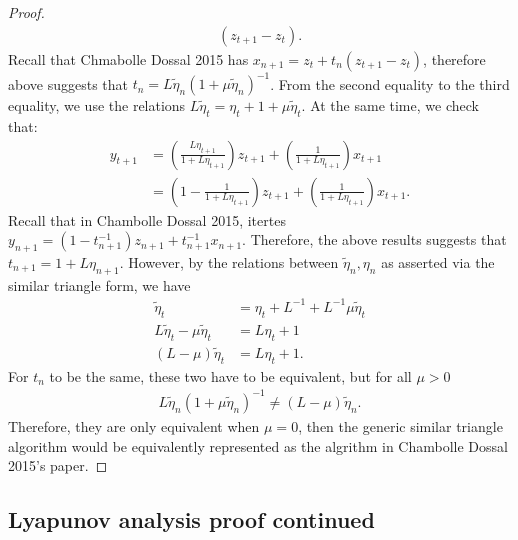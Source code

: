 \documentclass[12pt]{article}
\begin{document}
\begin{proof}
\begin{align*}
                (z_{t + 1} - z_t). 
            \end{align*}
            Recall that Chmabolle Dossal 2015 has $x_{n + 1} = z_t + t_n(z_{t + 1} - z_t)$, 
            therefore above suggests that $t_n = L \tilde \eta_{n}(1 + \mu \tilde \eta_{n})^{-1}$. 
            From the second equality to the third equality, we use the relations $L\tilde \eta_{t} = \eta_t + 1 + \mu\tilde \eta_{t}$.
            At the same time, we check that: 
            \begin{align*}
                y_{t + 1} &= \left(
                    \frac{L\eta_{t + 1}}{1 + L \eta_{t + 1}}
                \right)z_{t + 1} + 
                \left(
                    \frac{1}{1 + L \eta_{t + 1}}
                \right) x_{t + 1}
                \\
                &= 
                \left(
                    1 - \frac{1}{1 + L\eta_{t + 1}}
                \right)z_{t + 1} + 
                \left(
                    \frac{1}{1 + L \eta_{t + 1}}
                \right)x_{t + 1}. 
            \end{align*}
            Recall that in Chambolle Dossal 2015, itertes $y_{n + 1} = (1 - t_{n + 1}^{-1})z_{n + 1} + t_{n + 1}^{-1} x_{n + 1}$. 
            Therefore, the above results suggests that $t_{n + 1} = 1 + L\eta_{n + 1}$. 
            However, by the relations between $\tilde \eta_n, \eta_n$ as asserted via the similar triangle form, we have 
            \begin{align*}
                \tilde \eta_t &= \eta_t + L^{-1} + L^{-1}\mu \tilde \eta_t
                \\
                L\tilde \eta_t - \mu \tilde \eta_t 
                &= 
                L \eta_t + 1
                \\
                (L - \mu)\tilde \eta_t &= L\eta_t + 1. 
            \end{align*}
            For $t_n$ to be the same, these two have to be equivalent, but for all $\mu > 0$
            \begin{align*}
                L\tilde \eta_n (1 + \mu \tilde \eta_n)^{-1} \not = 
                (L - \mu )\tilde \eta_n. 
            \end{align*}
            Therefore, they are only equivalent when $\mu = 0$, then the generic similar triangle algorithm would be equivalently represented as the algrithm in Chambolle Dossal 2015's paper. 
        \end{proof}
        \begin{proposition}
            
        \end{proposition}
    \subsection{Lyapunov analysis proof continued}
    

    
\end{document}
